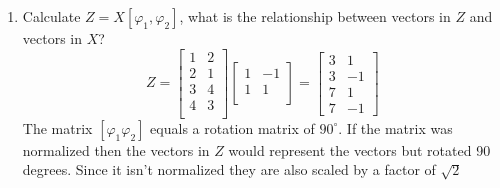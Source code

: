 \documentclass{article}
\begin{document}
\begin{enumerate}[1)]
\item Calculate $Z = X[\varphi_1, \varphi_2]$, what is the relationship between vectors in $Z$ and vectors in $X$?
$$
Z
=
\begin{bmatrix}
1 & 2 \\
2 & 1 \\
3 & 4 \\
4 & 3 \\
\end{bmatrix}
\begin{bmatrix}
1 & -1 \\
1 & 1 \\
\end{bmatrix}
=
\begin{bmatrix}
3 & 1 \\
3 & -1 \\
7 & 1 \\
7 & -1
\end{bmatrix}
$$
\newline
The matrix $[\varphi_1 \varphi_2]$ equals a rotation matrix of $90^\circ$.
If the matrix was normalized then the vectors in $Z$ would represent the vectors but rotated 90 degrees.
Since it isn't normalized they are also scaled by a factor of $\sqrt{2}$
\end{enumerate}
\end{document}
